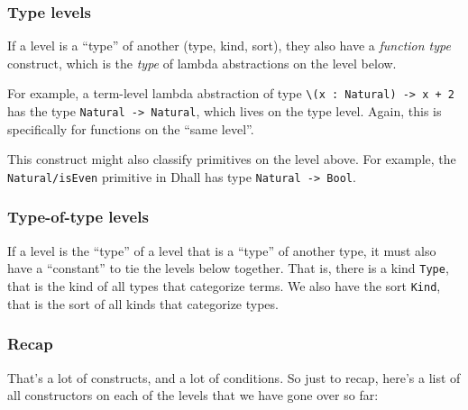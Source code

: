 \documentclass[]{article}
\begin{document}
\hypertarget{type-levels}{%
\subsubsection{Type levels}\label{type-levels}}

If a level is a ``type'' of another (type, kind, sort), they also have a
\emph{function type} construct, which is the \emph{type} of lambda abstractions
on the level below.

For example, a term-level lambda abstraction of type
\texttt{\textbackslash{}(x\ :\ Natural)\ -\textgreater{}\ x\ +\ 2} has the type
\texttt{Natural\ -\textgreater{}\ Natural}, which lives on the type level.
Again, this is specifically for functions on the ``same level''.

This construct might also classify primitives on the level above. For example,
the \texttt{Natural/isEven} primitive in Dhall has type
\texttt{Natural\ -\textgreater{}\ Bool}.

\hypertarget{type-of-type-levels}{%
\subsubsection{Type-of-type levels}\label{type-of-type-levels}}

If a level is the ``type'' of a level that is a ``type'' of another type, it
must also have a ``constant'' to tie the levels below together. That is, there
is a kind \texttt{Type}, that is the kind of all types that categorize terms. We
also have the sort \texttt{Kind}, that is the sort of all kinds that categorize
types.

\hypertarget{recap}{%
\subsubsection{Recap}\label{recap}}

That's a lot of constructs, and a lot of conditions. So just to recap, here's a
list of all constructors on each of the levels that we have gone over so far:
\end{document}
